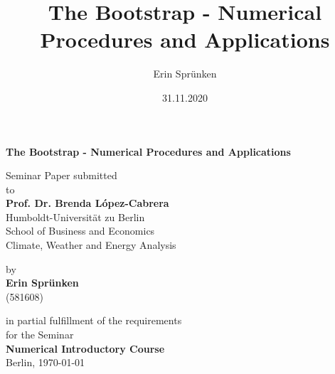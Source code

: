 \documentclass[12pt]{article}
\title{The Bootstrap - Numerical Procedures and Applications}
\author{Erin Sprünken}
\date{31.11.2020}
\begin{document}
		
		\begin{titlepage}
		\pagestyle{empty}
		\begin{center}

		    {\Large{\bf The Bootstrap - Numerical Procedures and Applications}} \vspace{0.5cm}


		    {\normalsize Seminar Paper submitted\\\vspace{0.5cm}
		    to}\\\vspace{0.5cm}
		    {\normalsize{\bf
			   	 Prof. Dr. Brenda López-Cabrera 
		 	     }}\\\vspace{0.5cm}
		    {\normalsize Humboldt-Universit\"at zu Berlin \\
		    School of Business and Economics \\
		    Climate, Weather and Energy Analysis} \vspace{1cm}


		    {\normalsize by \\\vspace{0.5cm}
		    {\bf Erin Sprünken} \\
		    (581608)} \vspace{1cm}


		    {\normalsize in partial fulfillment of the requirements \\
		    for the Seminar \\
		    {\bf Numerical Introductory Course} \\ 
		    Berlin, \today} %
		    

\end{center}
\end{titlepage}
\end{document}
